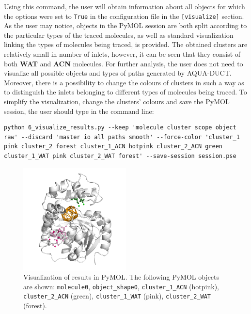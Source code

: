 \documentclass[9pt,tutorial]{livecoms}
\begin{document}
Using this command, the user will obtain information about all objects for which the options were set to \texttt{True} in the configuration file in the \texttt{[visualize]} section. As the user may notice, objects in the PyMOL session are both split according to the particular types of the traced molecules, as well as standard visualization linking the types of molecules being traced, is provided. The obtained clusters are relatively small in number of inlets, however, it can be seen that they consist of both \textbf{WAT} and \textbf{ACN} molecules. For further analysis, the user does not need to visualize all possible objects and types of paths generated by AQUA-DUCT. Moreover, there is a possibility to change the colours of clusters in such a way as to distinguish the inlets belonging to different types of molecules being traced. To simplify the visualization, change the clusters' colours and save the PyMOL session, the user should type in the command line:
\begin{lstlisting}
python 6_visualize_results.py --keep 'molecule cluster scope object raw' --discard 'master io all paths smooth' --force-color 'cluster_1 pink cluster_2 forest cluster_1_ACN hotpink cluster_2_ACN green cluster_1_WAT pink cluster_2_WAT forest' --save-session session.pse 
\end{lstlisting}
\begin{figure}[ht!]
\centering
\includegraphics[width=0.5\textwidth]{Tut6.2.png}
\caption{Visualization of results in PyMOL. The following PyMOL objects are shown: \texttt{molecule0}, \texttt{object\_shape0}, \texttt{cluster\_1\_ACN} (hotpink), \texttt{cluster\_2\_ACN} (green), \texttt{cluster\_1\_WAT} (pink), \texttt{cluster\_2\_WAT} (forest).}
\label{Tut6.2}
\end{figure}
\end{document}
